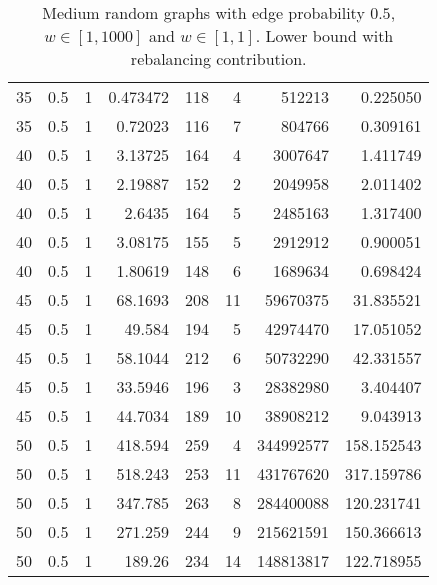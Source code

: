 \documentclass[a4paper,11pt]{article}
\begin{document}
\begin{table}
\begin{center}
\begin{tabular}{|rrr|r|r|rr|r|}
35 & 0.5 & 1 & 0.473472 & 118 & 4 & 512213 & 0.225050 \\
35 & 0.5 & 1 & 0.72023 & 116 & 7 & 804766 & 0.309161 \\
40 & 0.5 & 1 & 3.13725 & 164 & 4 & 3007647 & 1.411749 \\
40 & 0.5 & 1 & 2.19887 & 152 & 2 & 2049958 & 2.011402 \\
40 & 0.5 & 1 & 2.6435 & 164 & 5 & 2485163 & 1.317400 \\
40 & 0.5 & 1 & 3.08175 & 155 & 5 & 2912912 & 0.900051 \\
40 & 0.5 & 1 & 1.80619 & 148 & 6 & 1689634 & 0.698424 \\
45 & 0.5 & 1 & 68.1693 & 208 & 11 & 59670375 & 31.835521 \\
45 & 0.5 & 1 & 49.584 & 194 & 5 & 42974470 & 17.051052 \\
45 & 0.5 & 1 & 58.1044 & 212 & 6 & 50732290 & 42.331557 \\
45 & 0.5 & 1 & 33.5946 & 196 & 3 & 28382980 & 3.404407 \\
45 & 0.5 & 1 & 44.7034 & 189 & 10 & 38908212 & 9.043913 \\
50 & 0.5 & 1 & 418.594 & 259 & 4 & 344992577 & 158.152543 \\
50 & 0.5 & 1 & 518.243 & 253 & 11 & 431767620 & 317.159786 \\
50 & 0.5 & 1 & 347.785 & 263 & 8 & 284400088 & 120.231741 \\
50 & 0.5 & 1 & 271.259 & 244 & 9 & 215621591 & 150.366613 \\
50 & 0.5 & 1 & 189.26 & 234 & 14 & 148813817 & 122.718955 \\
\hline
\end{tabular}
\end{center}
\caption{Medium random graphs with edge probability $0.5$,
  $w\in[1,1000]$ and $w\in[1,1]$. Lower bound with rebalancing
  contribution.}
\label{tab:medium-rebal}
\end{table}
\end{document}
